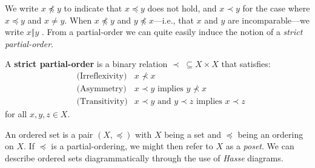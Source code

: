 We write $x \npreceq y$ to indicate that $x \preceq y$ does not hold, and $x \prec y$ for the case where $x\preceq y$ and $x \not = y$. When $x \not \preceq y$ and $y \not \preceq x$---i.e., that $x$ and $y$ are incomparable---we write $x \Vert y$ \cite{Davey_Priestley_2002}. From a partial-order we can quite easily induce the notion of a \emph{strict partial-order}.

\begin{definition}
  \label{definition:strict-partial-order}
  A \textbf{strict partial-order}  is a binary relation $\prec \; \subseteq X \times X$ that satisfies:
  \begin{align}
    & \text{(Irreflexivity)} & x \nprec x \\
    & \text{(Asymmetry)} & x \prec y \text{ implies } y \nprec x \\
    & \text{(Transitivity)} & x \prec y \text{ and } y \prec z \text{ implies } x \prec z
  \end{align}
  for all $x,y,z \in X$.
\end{definition}

An ordered set is a pair $(X, \preceq)$ with $X$ being a set and $\preceq$ being an ordering on $X$. If $\preceq$ is a partial-ordering, we might then refer to $X$ as a \textit{poset}. We can describe ordered sets diagrammatically through the use of \textit{Hasse} diagrams.

